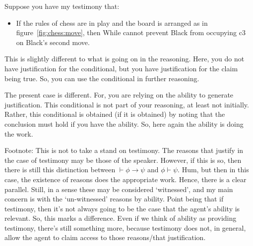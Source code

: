 \documentclass[10pt]{article}
\begin{document}
\begin{note}
  Suppose you have my testimony that:
  \begin{itemize}
  \item If the rules of chess are in play and the board is arranged as in figure~\ref{fig:chess:move}, then While cannot prevent Black from occupying c3 on Black's second move.
  \end{itemize}

  This is slightly different to what is going on in the reasoning.
  Here, you do not have justification for the conditional, but you have justification for the claim being true.
  So, you can use the conditional in further reasoning.

  The present case is different.
  For, you are relying on the ability to generate justification.
  This conditional is not part of your reasoning, at least not initially.
  Rather, this conditional is obtained (if it is obtained) by noting that the conclusion must hold if you have the ability.
  So, here again the ability is doing the work.

  {
    \color{red}
    Footnote:
    This is not to take a stand on testimony.
    The reasons that justify in the case of testimony may be those of the speaker.
    However, if this is so, then there is still this distinction between \(\vdash \phi \rightarrow \psi\) and \(\phi \vdash \psi\).
    Hum, but then in this case, the existence of reasons does the appropriate work.
    Hence, there is a clear parallel.
    Still, in a sense these may be considered `witnessed', and my main concern is with the `un-witnessed' reasons by ability.
    Point being that if testimony, then it's not always going to be the case that the agent's ability is relevant.
    So, this marks a difference.
    Even if we think of ability as providing testimony, there's still something more, because testimony does not, in general, allow the agent to claim access to those reasons/that justification.
  }
\end{note}
\end{document}
